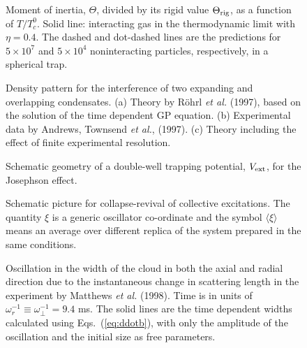 \bigskip

\begin{figure}[t]
\epsfysize=8cm
\hspace{3cm}
\caption{Moment of inertia, $\Theta$, divided by its rigid value 
$\Theta_{\rm rig}$,  as a function of $T/T_c^0$. Solid line:
interacting gas in the thermodynamic limit with $\eta=0.4$. The dashed and
dot-dashed lines are the predictions for $5\times 10^7$ and
$5\times 10^4$ noninteracting particles, respectively, in a spherical 
trap.  }
\label{fig:inertia}
\end{figure}

\bigskip

\begin{figure}[t]
\epsfysize=10cm
\hspace{3cm}
\caption{Density pattern for the interference of two expanding and 
overlapping condensates. (a) Theory by R\"ohrl {\it et al.} (1997),
based on the solution of the time dependent GP equation. 
(b) Experimental data by Andrews, Townsend {\it et al.}, (1997). 
(c) Theory including the effect of finite experimental resolution. }
\label{fig:interference}
\end{figure}

\bigskip

\begin{figure}[t]
\epsfysize=8cm
\hspace{3cm}
\caption{Schematic geometry of a double-well trapping potential, $V_{\rm ext}$,
for the Josephson effect.  }
\label{fig:josephson}
\end{figure}

\bigskip

\begin{figure}[t]
\epsfysize=8cm
\hspace{3cm}
\caption{Schematic picture for collapse-revival of collective excitations. The
quantity $\xi$ is a generic oscillator co-ordinate and the symbol $\langle \xi
\rangle$ means an average over different replica of the system prepared in the
same conditions. }
\label{fig:collapse}
\end{figure}


\begin{figure}[t]
\epsfysize=8cm
\hspace{3cm}
\caption{Oscillation in the width of the cloud in both the axial and
  radial direction due to the instantaneous change in scattering
  length in the experiment by Matthews {\it et al.} (1998). Time is
  in units of $\omega_r^{-1} \equiv 
  \omega_\perp^{-1} = 9.4$ ms. The solid lines are the time dependent 
  widths calculated using Eqs.~(\protect\ref{eq:ddotb}), with only the
  amplitude of the oscillation and the initial size as free parameters.}
\label{fig:jila-tn}
\end{figure}


